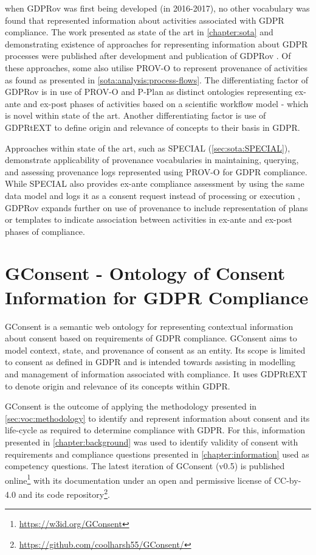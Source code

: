 when GDPRov was first being developed (in 2016-2017), no other vocabulary was found that represented information about activities associated with GDPR compliance.
The work presented as state of the art in \autoref{chapter:sota} and demonstrating existence of approaches for representing information about GDPR processes were published after development and publication of GDPRov \cite{pandit_modelling_2017}. Of these approaches, some also utilise PROV-O to represent provenance of activities as found as presented in \autoref{sota:analysis:process-flows}. The differentiating factor of GDPRov is in use of PROV-O and P-Plan as distinct ontologies representing ex-ante and ex-post phases of activities based on a scientific workflow model - which is novel within state of the art. Another differentiating factor is use of GDPRtEXT to define origin and relevance of concepts to their basis in GDPR.

Approaches within state of the art, such as SPECIAL (\autoref{sec:sota:SPECIAL}), demonstrate applicability of provenance vocabularies in maintaining, querying, and assessing provenance logs represented using PROV-O for GDPR compliance.
While SPECIAL also provides ex-ante compliance assessment by using the same data model and logs it as a consent request instead of processing or execution \cite{dullaert_d3.4_2019}, GDPRov expands further on use of provenance to include representation of plans or templates to indicate association between activities in ex-ante and ex-post phases of compliance.

\section{GConsent - Ontology of Consent Information for GDPR Compliance}\label{sec:voc:GConsent}
GConsent is a semantic web ontology for representing contextual information about consent based on requirements of GDPR compliance. 
GConsent aims to model context, state, and provenance of consent as an entity.
Its scope is limited to consent as defined in GDPR and is intended towards assisting in modelling and management of information associated with compliance.
It uses GDPRtEXT to denote origin and relevance of its concepts within GDPR.

GConsent is the outcome of applying the methodology presented in \autoref{sec:voc:methodology} to identify and represent information about consent and its life-cycle as required to determine compliance with GDPR.
For this, information presented in \autoref{chapter:background} was used to identify validity of consent with requirements and compliance questions presented in \autoref{chapter:information} used as competency questions.
The latest iteration of GConsent (v0.5) is published online\footnote{\url{https://w3id.org/GConsent}} with its documentation under an open and permissive license of CC-by-4.0 and its code repository\footnote{\url{https://github.com/coolharsh55/GConsent/}}.

